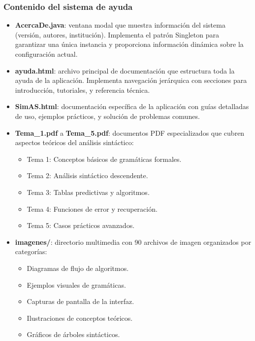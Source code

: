 \subsubsection{Contenido del sistema de ayuda}

\begin{itemize}
    \item \textbf{AcercaDe.java}: ventana modal que muestra información del sistema (versión, autores, institución). Implementa el patrón Singleton para garantizar una única instancia y proporciona información dinámica sobre la configuración actual.

    \item \textbf{ayuda.html}: archivo principal de documentación que estructura toda la ayuda de la aplicación. Implementa navegación jerárquica con secciones para introducción, tutoriales, y referencia técnica.

    \item \textbf{SimAS.html}: documentación específica de la aplicación con guías detalladas de uso, ejemplos prácticos, y solución de problemas comunes.

    \item \textbf{Tema\_1.pdf} a \textbf{Tema\_5.pdf}: documentos PDF especializados que cubren aspectos teóricos del análisis sintáctico:
    \begin{itemize}
        \item Tema 1: Conceptos básicos de gramáticas formales.
        \item Tema 2: Análisis sintáctico descendente.
        \item Tema 3: Tablas predictivas y algoritmos.
        \item Tema 4: Funciones de error y recuperación.
        \item Tema 5: Casos prácticos avanzados.
    \end{itemize}

    \item \textbf{imagenes/}: directorio multimedia con 90 archivos de imagen organizados por categorías:
    \begin{itemize}
        \item Diagramas de flujo de algoritmos.
        \item Ejemplos visuales de gramáticas.
        \item Capturas de pantalla de la interfaz.
        \item Ilustraciones de conceptos teóricos.
        \item Gráficos de árboles sintácticos.
    \end{itemize}
\end{itemize}

